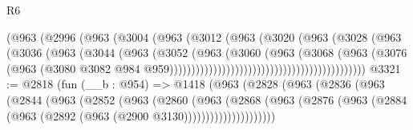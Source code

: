 \begin{lexlean}{R6}
\begin{coremodule}
                                              (@963
                                                (@2996
                                                  (@963
                                                    (@3004
                                                      (@963
                                                        (@3012
                                                          (@963
                                                            (@3020
                                                              (@963
                                                                (@3028
                                                                  (@963
                                                                    (@3036
                                                                      (@963
                                                                        (@3044
                                                                          (@963
                                                                            (@3052
                                                                              (@963
                                                                                (@3060
                                                                                  (@963
                                                                                    (@3068
                                                                                      (@963
                                                                                        (@3076
                                                                                          (@963
                                                                                            (@3080
                                                                                              @3082
                                                                                              @984
                                                                                              @959)))))))))))))))))))))))))))))))))))))))))))))
@3321 := @2818
    (fun (__b : @954) =>
    @1418
      (@963
        (@2828
          (@963
            (@2836
              (@963
                (@2844
                  (@963
                    (@2852
                      (@963
                        (@2860
                          (@963
                            (@2868
                              (@963
                                (@2876
                                  (@963 (@2884 (@963 (@2892 (@963 (@2900 @3130)))))))))))))))))))))

\end{coremodule}
\end{lexlean}
